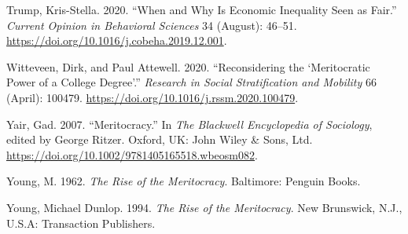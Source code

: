 \documentclass[
]{article}
\begin{document}
\leavevmode\hypertarget{ref-TrumpWhenwhyeconomic2020}{}%
Trump, Kris-Stella. 2020. ``When and Why Is Economic Inequality Seen as
Fair.'' \emph{Current Opinion in Behavioral Sciences} 34 (August):
46--51. \url{https://doi.org/10.1016/j.cobeha.2019.12.001}.

\leavevmode\hypertarget{ref-WitteveenReconsideringmeritocraticpower2020a}{}%
Witteveen, Dirk, and Paul Attewell. 2020. ``Reconsidering the
`Meritocratic Power of a College Degree'.'' \emph{Research in Social
Stratification and Mobility} 66 (April): 100479.
\url{https://doi.org/10.1016/j.rssm.2020.100479}.

\leavevmode\hypertarget{ref-yairMeritocracy2007}{}%
Yair, Gad. 2007. ``Meritocracy.'' In \emph{The Blackwell Encyclopedia of
Sociology}, edited by George Ritzer. Oxford, UK: John Wiley \& Sons,
Ltd. \url{https://doi.org/10.1002/9781405165518.wbeosm082}.

\leavevmode\hypertarget{ref-young_rise_1962}{}%
Young, M. 1962. \emph{The Rise of the Meritocracy}. Baltimore: Penguin
Books.

\leavevmode\hypertarget{ref-youngRiseMeritocracy1994}{}%
Young, Michael Dunlop. 1994. \emph{The Rise of the Meritocracy}. New
Brunswick, N.J., U.S.A: Transaction Publishers.
\end{document}
